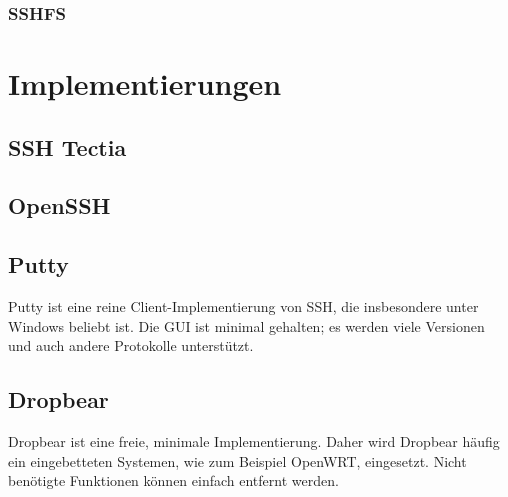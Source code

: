 \documentclass[fleqn,10pt]{SelfArx} %
\begin{document}
\subsubsection{SSHFS}
\section{Implementierungen}
\subsection{SSH Tectia}
\subsection{OpenSSH}
\subsection{Putty}
Putty ist eine reine Client-Implementierung von SSH, die insbesondere unter Windows beliebt ist. Die GUI ist minimal gehalten; es werden viele Versionen und auch andere Protokolle unterstützt.
\subsection{Dropbear}
Dropbear ist eine freie, minimale Implementierung. Daher wird Dropbear häufig ein eingebetteten Systemen, wie zum Beispiel OpenWRT, eingesetzt. Nicht benötigte Funktionen können einfach entfernt werden.





\printbibliography%
\end{document}
